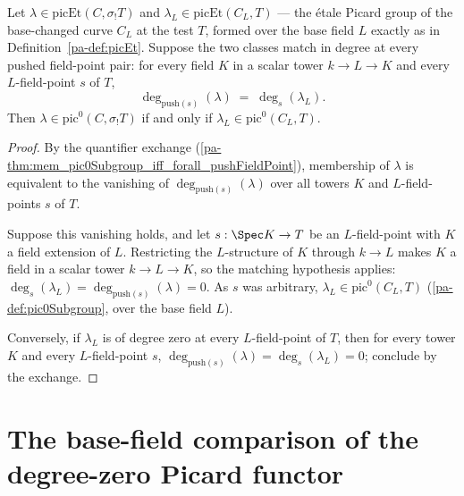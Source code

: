 \begin{theorem}
  \label{pa-thm:mem_pic0Subgroup_iff_of_degAt_pushFieldPoint_eq}
  \leanok

  Let \(\lambda \in \mathrm{picEt}(C, \sigma_{!}T)\) and
  \(\lambda_L \in \mathrm{picEt}(C_L, T)\) --- the \'etale Picard group of the
  base-changed curve \(C_L\) at the test \(T\), formed over the base field \(L\)
  exactly as in Definition~\ref{pa-def:picEt}. Suppose the two classes match in degree at
  every pushed field-point pair: for every field \(K\) in a scalar tower
  \(k \to L \to K\) and every \(L\)-field-point \(s\) of \(T\),
  \[
    \deg_{\mathrm{push}(s)}(\lambda) \;=\; \deg_{s}(\lambda_L).
  \]
  Then \(\lambda \in \mathrm{pic}^0(C, \sigma_{!}T)\) if and only if
  \(\lambda_L \in \mathrm{pic}^0(C_L, T)\).
\end{theorem}
\begin{proof}
  \leanok
  By the quantifier exchange
  (\ref{pa-thm:mem_pic0Subgroup_iff_forall_pushFieldPoint}), membership of \(\lambda\) is
  equivalent to the vanishing of \(\deg_{\mathrm{push}(s)}(\lambda)\) over all towers
  \(K\) and \(L\)-field-points \(s\) of \(T\).

  Suppose this vanishing holds, and let \(s : \Spec K \to T\) be an \(L\)-field-point
  with \(K\) a field extension of \(L\). Restricting the \(L\)-structure of \(K\)
  through \(k \to L\) makes \(K\) a field in a scalar tower \(k \to L \to K\), so the
  matching hypothesis applies:
  \(\deg_s(\lambda_L) = \deg_{\mathrm{push}(s)}(\lambda) = 0\). As \(s\) was
  arbitrary, \(\lambda_L \in \mathrm{pic}^0(C_L, T)\) (\ref{pa-def:pic0Subgroup}, over
  the base field \(L\)).

  Conversely, if \(\lambda_L\) is of degree zero at every \(L\)-field-point of \(T\),
  then for every tower \(K\) and every \(L\)-field-point \(s\),
  \(\deg_{\mathrm{push}(s)}(\lambda) = \deg_s(\lambda_L) = 0\); conclude by the
  exchange.
\end{proof}

\section{The base-field comparison of the degree-zero Picard functor}
\label{pa-sec:pic0Theta}

